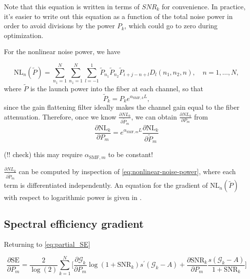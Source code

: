 \documentclass[a4paper]{article}
\begin{document}
Note that this equation is written in terms of $SNR_k$ for convenience. In practice, it's easier to write out this equation as a function of the total noise power in order to avoid divisions by the power $P_k$, which could go to zero during optimization. 

For the nonlinear noise power, we have

\begin{equation} \label{eq:nonlinear-noise-power}
	\mathrm{NL}_n(\tilde{P}) = \sum_{n_1 = 1}^{N}\sum_{n_1 = 1}^N\sum_{l=-1}^{1}\tilde{P}_{n_1}\tilde{P}_{n_2}\tilde{P}_{i+j-n+l}D_l(n_1, n_2, n), \quad n = 1, \ldots, N,
\end{equation}
where $\tilde{P}$ is the launch power into the fiber at each channel, so that
\begin{equation}
	\tilde{P}_k = P_ke^{\alpha_{\text{SMF}, k}L},
\end{equation}
since the gain flattening filter ideally makes the channel gain equal to the fiber attenuation. Therefore, once we know $\frac{\partial NL_k}{\partial\tilde{P}_m}$, we can obtain $\frac{\partial NL_k}{\partial P_m}$ from
\begin{equation}
	\frac{\partial\mathrm{NL}_k}{\partial P_m} = e^{\alpha_{\text{SMF}, m}L}\frac{\partial\mathrm{NL}_k}{\partial\tilde{P}_m}
\end{equation}

\noindent (!! check) this may require $\alpha_{\text{SMF}, m}$ to be constant!

$\frac{\partial NL_k}{\partial\tilde{P}_m}$ can be computed by inspection of \eqref{eq:nonlinear-noise-power}, where each term is differentiated independently. An equation for the gradient of $\mathrm{NL}_n(\tilde{P})$ with respect to logarithmic power is given in \cite[Appendix]{Roberts2016}. 

\subsection{Spectral efficiency gradient}

Returning to \eqref{eq:partial_SE}

\begin{equation}
\frac{\partial\mathrm{SE}}{\partial P_m} = \frac{2}{\log(2)}\sum_{k = 1}^N \bigg [
\frac{\partial \mathcal{G}_k}{\partial P_m} \log(1 + \mathrm{SNR}_k) s^{\prime}(\mathcal{G}_k - A) + \frac{\partial \mathrm{SNR}_k}{\partial P_m}\frac{ s(\mathcal{G}_k - A)}{1 + \mathrm{SNR}_k}
\bigg]
\end{equation}
 
\end{document}
